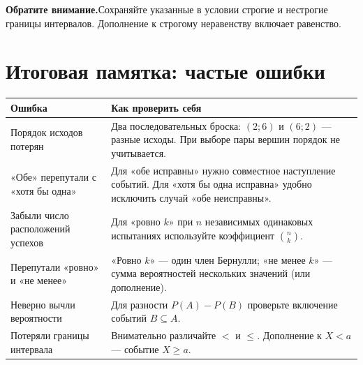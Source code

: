 \documentclass[a4paper,12pt]{article}
\newcommand{\topic}[1]{\section{#1}\vspace{-2mm}}
\newcommand{\warning}[1]{\textcolor{warn}{\textbf{Обратите внимание.}}\enspace #1}
\begin{document}
\warning{Сохраняйте указанные в условии строгие и нестрогие границы интервалов. Дополнение к строгому неравенству включает равенство.}

\topic{Итоговая памятка: частые ошибки}
\begin{tabularx}{\linewidth}{@{}p{.33\linewidth}X@{}}
\toprule
\textbf{Ошибка} & \textbf{Как проверить себя}\\
\midrule
Порядок исходов потерян & Два последовательных броска: $(2;6)$ и $(6;2)$ --- разные исходы. При выборе пары вершин порядок не учитывается.\\
\addlinespace[3pt]
«Обе» перепутали с «хотя бы одна» & Для «обе исправны» нужно совместное наступление событий. Для «хотя бы одна исправна» удобно исключить случай «обе неисправны».\\
\addlinespace[3pt]
Забыли число расположений успехов & Для «ровно $k$» при $n$ независимых одинаковых испытаниях используйте коэффициент $\binom nk$.\\
\addlinespace[3pt]
Перепутали «ровно» и «не менее» & «Ровно $k$» --- один член Бернулли; «не менее $k$» --- сумма вероятностей нескольких значений (или дополнение).\\
\addlinespace[3pt]
Неверно вычли вероятности & Для разности $P(A)-P(B)$ проверьте включение событий $B\subseteq A$.\\
\addlinespace[3pt]
Потеряли границы интервала & Внимательно различайте $<$ и $\le$. Дополнение к $X<a$ --- событие $X\ge a$.\\
\bottomrule
\end{tabularx}
\end{document}
